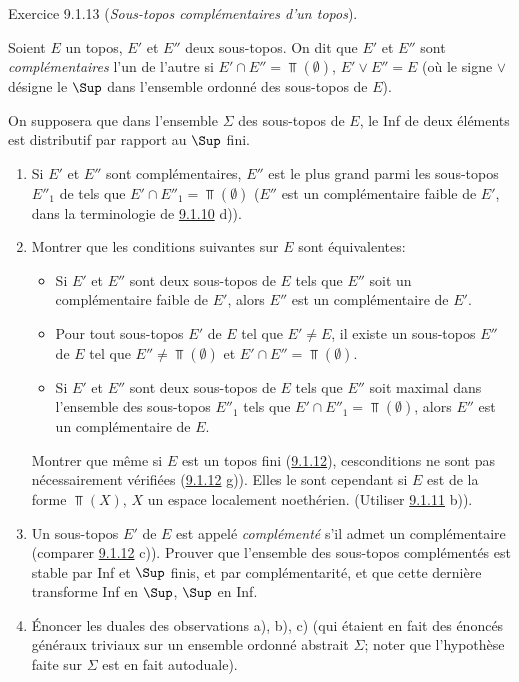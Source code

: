 \begin{enonce*}[remark]{Exercice 9.1.13}
(\emph{Sous-topos complémentaires d'un topos}).

Soient $E$ un topos, $E'$ et $E''$ deux sous-topos. On dit que $E'$
et $E''$ sont \emph{complémentaires} l'un de l'autre si $E'\cap
E''=\Top(∅)$, $E'\vee E''=E$ (où le signe $\vee$ désigne le
$\Sup$ dans l'ensemble ordonné des sous-topos de $E$).

On supposera que dans l'ensemble $\Sigma$ des sous-topos de $E$, le
Inf de deux éléments est distributif par rapport au $\Sup$ fini.

\begin{enumerate}
\renewcommand{\theenumi}{\alph{enumi}}
\renewcommand{\labelenumi}{\theenumi)}
\item Si $E'$ et $E''$ sont complémentaires, $E''$ est le plus grand
parmi les sous-topos $E''_1$ de tels que $E'\cap E''_1=\Top(∅)$
(\ie $E''$ est un complémentaire faible de $E'$, dans la
terminologie de \hyperref[IV.exer9.1.10]{9.1.10} d)).

\item Montrer que les conditions suivantes sur $E$ sont équivalentes:
\begin{itemize}
\item[(i)] Si $E'$ et $E''$ sont deux sous-topos de $E$ tels que $E''$
soit un complémentaire faible de $E'$, alors $E''$ est un
complémentaire de $E'$.

\item[(ii)] Pour tout sous-topos $E'$ de $E$ tel que $E'\neq E$, il
existe un sous-topos $E''$ de $E$ tel que $E''\neq \Top(∅)$ et
$E'\cap E''=\Top(∅)$.

\item[(i bis)] Si $E'$ et $E''$ sont deux sous-topos de $E$ tels que
$E''$ soit maximal dans l'ensemble des sous-topos $E''_1$ tels que
$E'\cap E''_1=\Top(∅)$, alors $E''$ est un complémentaire de $E$.
\end{itemize}

Montrer que même si $E$ est un topos fini (\hyperref[IV.exer9.1.12]{9.1.12}),
ces\pageoriginale conditions ne sont pas nécessairement vérifiées
(\hyperref[IV.exer9.1.12]{9.1.12} g)). Elles le sont cependant si $E$ est de la
forme $\Top(X)$, $X$ un espace localement noethérien. (Utiliser
\hyperref[IV.exer9.1.11]{9.1.11} b)).

\item Un sous-topos $E'$ de $E$ est appelé \emph{complémenté} s'il
admet un complémentaire (comparer \hyperref[IV.exer9.1.12]{9.1.12} c)). Prouver
que l'ensemble des sous-topos complémentés est stable par Inf et
$\Sup$ finis, et par complémentarité, et que cette dernière
transforme Inf en $\Sup$, $\Sup$ en Inf.

\item Énoncer les duales des observations a), b), c) (qui étaient en
fait des énoncés généraux triviaux sur un ensemble ordonné abstrait
$\Sigma$; noter que l'hypothèse faite sur $\Sigma$ est en fait
autoduale).
\end{enumerate}
\end{enonce*}

